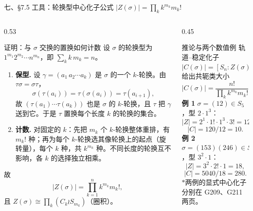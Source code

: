 \documentclass[aspectratio=169,10pt,fontset=none]{ctexbeamer}
\newcommand{\key}[1]{\textcolor{ink}{\bfseries #1}}
\newcommand{\starpt}{\textcolor{accent}{\bfseries$\ast$}}
\begin{document}
\begin{frame}[t]{七、\S7.5 工具：轮换型中心化子公式 $|Z(\sigma)|=\prod_k k^{m_k}m_k!$}
\scriptsize
\begin{columns}[T,onlytextwidth]
  \begin{column}{0.53\textwidth}
    \begin{block}{\footnotesize 证明：与 $\sigma$ 交换的置换如何计数}
      \scriptsize
      设 $\sigma$ 的轮换型为 $1^{m_1}2^{m_2}\cdots n^{m_n}$，即 $\sum_k k\,m_k=n$。
      \begin{enumerate}\setlength{\itemsep}{0pt}\setlength{\parskip}{0pt}
        \item \key{保型.} 设 $\gamma=(a_1\,a_2\cdots a_k)$ 是 $\sigma$ 的一个 $k$-轮换。由 $\tau\sigma=\sigma\tau$，
        \[ \sigma(\tau(a_i))=\tau(\sigma(a_i))=\tau(a_{i+1}), \]
        故 $(\tau(a_1)\cdots\tau(a_k))$ 也是 $\sigma$ 的 $k$-轮换，且 $\tau$ 把 $\gamma$ 送到它。于是 $\tau$ 置换每个长度 $k$ 的轮换的集合。
        \item \key{计数.} 对固定的 $k$：先把 $m_k$ 个 $k$-轮换整体重排，有 $m_k!$ 种；再为每个 $k$-轮换选其像轮换上的起点（旋转量），每个 $k$ 种，共 $k^{m_k}$ 种。不同长度的轮换互不影响，各 $k$ 的选择独立相乘。
      \end{enumerate}
      故
      \[ |Z(\sigma)|=\prod_{k=1}^{n}k^{m_k}m_k!, \]
      且 $Z(\sigma)\cong\prod_k(C_k\wr S_{m_k})$（圈积）。
    \end{block}
  \end{column}
  \begin{column}{0.45\textwidth}
    \begin{block}{\footnotesize 推论与两个数值例}
      \scriptsize
      轨道--稳定化子 $|C(\sigma)|=[S_n:Z(\sigma)]$ 给出共轭类大小
      \[ |C(\sigma)|=\frac{n!}{\prod_k k^{m_k}m_k!}. \]
      \key{例 1} $\sigma=(12)\in S_5$，型 $2\cdot1^3$：
      \[ |Z|=2^1\cdot1!\cdot1^3\cdot3!=12, \]
      \[ |C|=120/12=10. \]
      \key{例 2} $\sigma=(153)(246)\in S_7$，型 $3^2\cdot1$：
      \[ |Z|=3^2\cdot2!\cdot1=18, \]
      \[ |C|=5040/18=280. \]
      \starpt 两例的显式中心化子分别在 G209、G211 两页。
    \end{block}
  \end{column}
\end{columns}
\end{frame}
\end{document}
